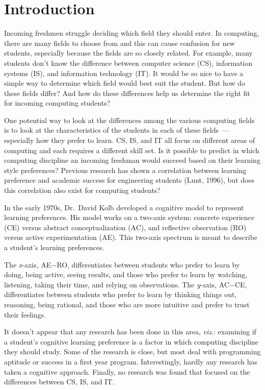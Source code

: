 \chapter{Introduction}\label{chp:chapter1}
Incoming freshmen struggle deciding which field they should enter. In computing, there are many fields to choose from and this can cause confusion for new students, especially because the fields are so closely related. For example, many students don't know the difference between computer science (CS), information systems (IS), and information technology (IT). It would be so nice to have a simple way to determine which field would best suit the student. But how do these fields differ? And how do these differences help us determine the right fit for incoming computing students?

One potential way to look at the differences among the various computing fields is to look at the characteristics of the students in each of these fields~--- especially how they prefer to learn. CS, IS, and IT all focus on different areas of computing and each requires a different skill set. Is it possible to predict in which computing discipline an incoming freshman would succeed based on their learning style preferences? Previous research has shown a correlation between learning preference and academic success for engineering students (Lunt, 1996), but does this correlation also exist for computing students?

In the early 1970s, Dr.\ David Kolb developed a cognitive model to represent learning preferences. His model works on a two-axis system: concrete experience (CE) versus abstract conceptualization (AC), and reflective observation (RO) versus active experimentation (AE). This two-axis spectrum is meant to describe a student's learning preferences.

The \textit{x}-axis, AE$-$RO, differentiates between students who prefer to learn by doing, being active, seeing results, and those who prefer to learn by watching, listening, taking their time, and relying on observations. The \textit{y}-axis, AC$-$CE, differentiates between students who prefer to learn by thinking things out, reasoning, being rational, and those who are more intuitive and prefer to trust their feelings.

It doesn't appear that any research has been done in this area, \textit{viz}.: examining if a student's cognitive learning preference is a factor in which computing discipline they should study. Some of the research is close, but most deal with programming aptitude or success in a first year program. Interestingly, hardly any research has taken a cognitive approach. Finally, no research was found that focused on the differences between CS, IS, and IT.

